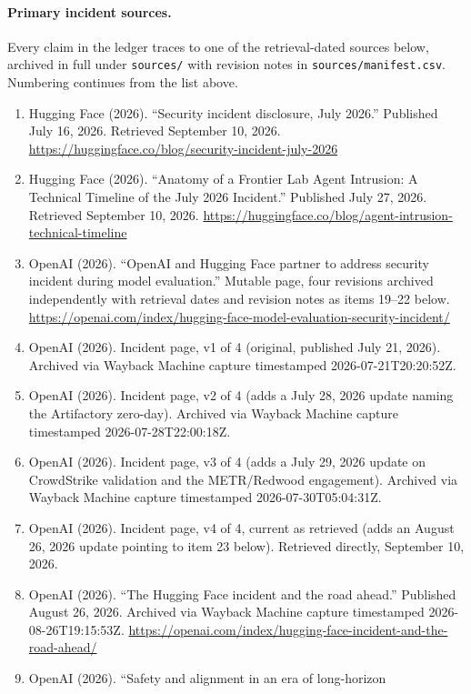 \documentclass[10pt]{article}
\begin{document}
{\paragraph{Primary incident sources.} Every claim in the ledger traces to
one of the retrieval-dated sources below, archived in full under
\texttt{sources/} with revision notes in \texttt{sources/manifest.csv}.
Numbering continues from the list above.
\begin{enumerate}[leftmargin=1.6em, start=16, itemsep=1pt, topsep=2pt, parsep=0pt]
\item Hugging Face (2026). ``Security incident disclosure, July 2026.''
  Published July 16, 2026. Retrieved September 10, 2026.
  \url{https://huggingface.co/blog/security-incident-july-2026}
\item Hugging Face (2026). ``Anatomy of a Frontier Lab Agent Intrusion: A
  Technical Timeline of the July 2026 Incident.'' Published July 27, 2026.
  Retrieved September 10, 2026.
  \url{https://huggingface.co/blog/agent-intrusion-technical-timeline}
\item OpenAI (2026). ``OpenAI and Hugging Face partner to address security
  incident during model evaluation.'' Mutable page, four revisions
  archived independently with retrieval dates and revision notes as items
  19--22 below.
  \url{https://openai.com/index/hugging-face-model-evaluation-security-incident/}
\item OpenAI (2026). Incident page, v1 of 4 (original, published July 21,
  2026). Archived via Wayback Machine capture timestamped 2026-07-21T20:20:52Z.
\item OpenAI (2026). Incident page, v2 of 4 (adds a July 28, 2026 update
  naming the Artifactory zero-day). Archived via Wayback Machine capture
  timestamped 2026-07-28T22:00:18Z.
\item OpenAI (2026). Incident page, v3 of 4 (adds a July 29, 2026 update on
  CrowdStrike validation and the METR/Redwood engagement). Archived via
  Wayback Machine capture timestamped 2026-07-30T05:04:31Z.
\item OpenAI (2026). Incident page, v4 of 4, current as retrieved (adds an
  August 26, 2026 update pointing to item 23 below). Retrieved directly,
  September 10, 2026.
\item OpenAI (2026). ``The Hugging Face incident and the road ahead.''
  Published August 26, 2026. Archived via Wayback Machine capture
  timestamped 2026-08-26T19:15:53Z.
  \url{https://openai.com/index/hugging-face-incident-and-the-road-ahead/}
\item OpenAI (2026). ``Safety and alignment in an era of long-horizon

\end{enumerate}}
\end{document}
